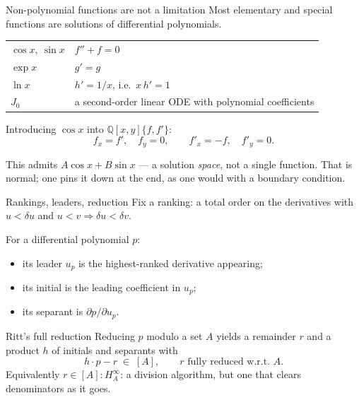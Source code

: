 \documentclass[10pt,aspectratio=169]{beamer}
\newcommand{\Q}{\mathbb{Q}}
\begin{document}
\begin{frame}{Non-polynomial functions are not a limitation}
Most elementary and special functions are solutions of differential polynomials.

\medskip
\begin{tabular}{ll}
  $\cos x,\ \sin x$ & $f'' + f = 0$ \\[3pt]
  $\exp x$          & $g' = g$ \\[3pt]
  $\ln x$           & $h' = 1/x$, i.e.\ $x\,h' = 1$ \\[3pt]
  $J_{0}$           & a second-order linear ODE with polynomial coefficients \\
\end{tabular}

\pause
\bigskip
Introducing $\cos x$ into $\Q[x,y]\{f,f'\}$:
\[
  f_{x} = f', \quad f_{y} = 0, \qquad f'_{x} = -f, \quad f'_{y} = 0 .
\]

\pause
This admits $A\cos x + B\sin x$ --- a solution \emph{space}, not a single
function. That is normal; one pins it down at the end, as one would with a
boundary condition.
\end{frame}

\begin{frame}{Rankings, leaders, reduction}
Fix a \alert{ranking}: a total order on the derivatives with
$u < \delta u$ and $u<v \Rightarrow \delta u < \delta v$.

\pause
\medskip
For a differential polynomial $p$:
\begin{itemize}
  \item its \alert{leader} $u_{p}$ is the highest-ranked derivative appearing;
  \item its \alert{initial} is the leading coefficient in $u_{p}$;
  \item its \alert{separant} is $\partial p / \partial u_{p}$.
\end{itemize}

\pause
\begin{block}{Ritt's full reduction}
Reducing $p$ modulo a set $A$ yields a remainder $r$ and a product $h$ of
initials and separants with
\[
  h\cdot p - r \;\in\; [A],
  \qquad
  r \text{ fully reduced w.r.t.\ } A .
\]
Equivalently $r \in [A] : H_{A}^{\infty}$: a division algorithm, but one that
clears denominators as it goes.
\end{block}
\end{frame}
\end{document}
